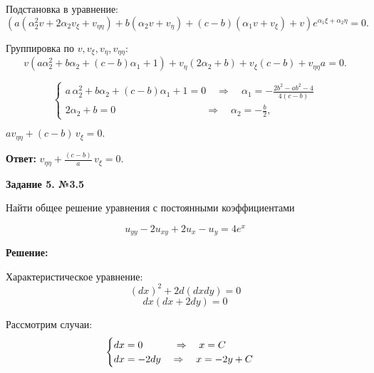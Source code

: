 \documentclass[a4paper,12pt]{article}
\begin{document}
Подстановка в уравнение:
\begin{equation*}
    (a(\alpha_2^2 v + 2\alpha_2 v_{\xi} + v_{\eta\eta}) + b (\alpha_2 v + v_{\eta}) + (c - b)(\alpha_1 v + v_{\xi}) + v) e^{\alpha_1 \xi + \alpha_2 \eta}= 0.
\end{equation*}

Группировка по $ v, v_{\xi}, v_{\eta}, v_{\eta\eta} $:
\begin{equation*}
    v\left( a \alpha_2^2 + b \alpha_2 + (c - b) \alpha_1 + 1 \right) + 
    v_{\eta} \left( 2\alpha_2 + b \right) + 
    v_{\xi} (c - b) + 
    v_{\eta\eta} a = 0.
\end{equation*}

\begin{equation*}
 \begin{cases}
a\, \alpha_2^2 + b\alpha_2+(c - b) \alpha_1 + 1 = 0 \quad\Longrightarrow\quad \alpha_1 = -\frac{2b^2-ab^2-4}{4(c-b)} \\
2\alpha_2 + b = 0 \quad \quad \quad \quad \quad \quad \quad \quad \quad\Longrightarrow\quad \alpha_2 = -\frac{b}{2},
\end{cases}
\end{equation*}

$av_{\eta\eta} + (c - b)\,v_{\xi} = 0.$

\vspace{2mm}
\textbf{Ответ:} $v_{\eta\eta} + \frac{(c - b)}{a}\,v_{\xi} = 0.$

\vspace{100mm}
\vspace{79mm}
\begin{center}    
    \textbf{Задание 5. №3.5}
\end{center}

Найти общее решение уравнения с постоянными коэффициентами

\begin{equation*}
    u_{yy} - 2u_{xy} + 2u_x - u_y = 4e^x
\end{equation*}

\textbf{Решение:}

Характеристическое уравнение:
\begin{equation*}
    (dx)^2 + 2d(dx dy) = 0
\end{equation*}
\begin{equation*}
    dx (dx + 2 dy) = 0
\end{equation*}

Рассмотрим случаи:
\[
\begin{cases}
    dx = 0 \hspace{11mm} \Rightarrow \quad   x = C \\
    dx = -2dy \quad \Rightarrow \quad x = -2y + C
\end{cases}
\]
\end{document}
